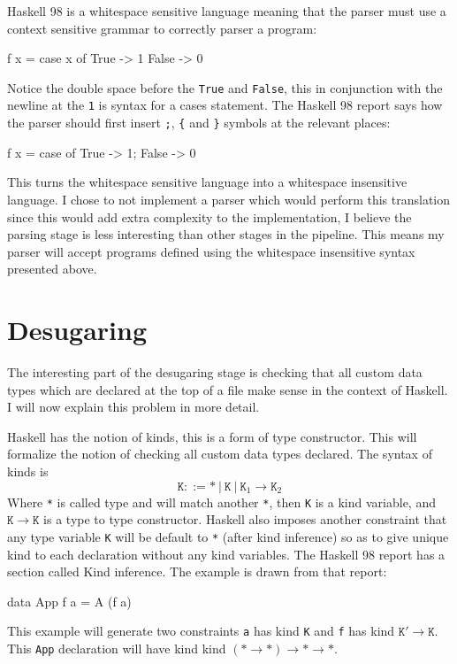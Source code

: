 \documentclass[float=false, crop=false]{standalone}
\begin{document}
Haskell 98 is a whitespace sensitive language meaning that the parser must use a
context sensitive grammar to correctly parser a program:
\begin{HaskellLst}
f x = case x of 
  True  -> 1
  False -> 0
\end{HaskellLst}
Notice the double space before the \texttt{True} and \texttt{False}, this in conjunction with the
newline at the \texttt{1} is syntax for a cases statement. The Haskell 98 report
says how the parser should first insert \texttt{;},  \texttt{\{} and \texttt{\}} symbols at the 
relevant places:
\begin{HaskellLst}
f x = case of {
  True  -> 1;
  False -> 0
}
\end{HaskellLst}
This turns the whitespace sensitive language into a whitespace insensitive language. I chose to 
not implement a parser which would perform this translation since this would add extra complexity to the
implementation, I believe the parsing stage is less interesting than other stages in the pipeline.
This means my parser will accept programs defined using the whitespace insensitive 
syntax presented above.


\section{Desugaring}

The interesting part of the desugaring stage is 
checking that all custom data types which are declared at the top of a
file make sense in the context of Haskell. I will now explain this
problem in more detail.

Haskell has the notion of kinds, this is a form of type constructor. This will
formalize the notion of checking all custom data types declared.
The syntax of kinds is
\[ \mathtt{K} ::= \mathtt{*}\ |\ \mathtt{K}\  |\ \mathtt{K}_1 \rightarrow \mathtt{K}_2 \] 
Where \texttt{*} is called type and will match another
\texttt{*}, then \texttt{K} is a kind variable, and $\mathtt{K} \rightarrow \mathtt{K}$ is a type
to type constructor. Haskell also imposes another constraint that any type variable \texttt{K} will
be default to \texttt{*} (after kind inference) so as to give 
unique kind to each declaration without any kind variables.
The Haskell 98 report has a section \cite[4.6]{haskell98-spec} called Kind inference.
The example is drawn from that report:
\begin{HaskellLst}
data App f a = A (f a)
\end{HaskellLst}
This example will generate two constraints \texttt{a} has kind \texttt{K} and \texttt{f} 
has kind $\mathtt{K'} \rightarrow \mathtt{K}$. This \texttt{App} declaration will have kind  
kind $(\mathtt{*}\rightarrow\mathtt{*})\rightarrow\mathtt{*}\rightarrow
\mathtt{*}$.
\end{document}
